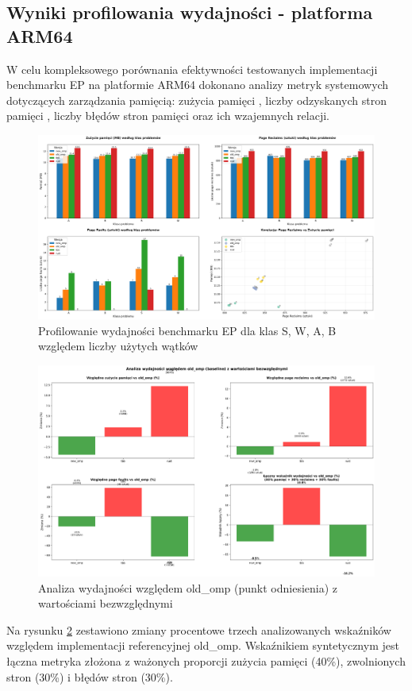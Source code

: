 \subsection{Wyniki profilowania wydajności - platforma ARM64}
W celu kompleksowego porównania efektywności testowanych implementacji benchmarku EP na platformie ARM64 dokonano analizy metryk systemowych dotyczących zarządzania pamięcią: zużycia pamięci , liczby odzyskanych stron pamięci , liczby błędów stron pamięci  oraz ich wzajemnych relacji.
\begin{figure}[H]
    \centering
    \includegraphics[width=\textwidth]{analiza/images/parallel/ep/arm/chart_01_memory_comparison.png}
    \caption{Profilowanie wydajności benchmarku EP dla klas S, W, A, B względem liczby użytych wątków}
    \label{ep_porownanie_zuzycia_pamieci}
\end{figure}
 


\begin{figure}[H]
    \centering
    \includegraphics[width=\textwidth]{analiza/images/parallel/ep/arm/chart_05_performance_ratios.png}
    \caption{Analiza wydajności względem old\_omp (punkt odniesienia) z wartościami bezwzględnymi}
    \label{ep_analiza_wzgledem_old_omp}
\end{figure}
Na rysunku \ref{ep_analiza_wzgledem_old_omp} zestawiono zmiany procentowe trzech analizowanych wskaźników względem implementacji referencyjnej old\_omp. Wskaźnikiem syntetycznym jest łączna metryka złożona z ważonych proporcji zużycia pamięci (40\%), zwolnionych stron (30\%) i błędów stron (30\%).



